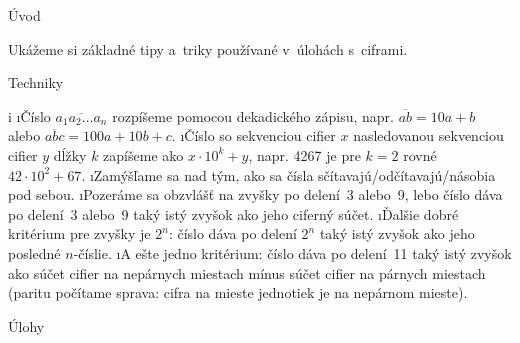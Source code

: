 





\sec Úvod

Ukážeme si základné tipy a~triky používané v~úlohách s~ciframi.

\sec Techniky

\begitems \style i
\i Číslo $\overline{a_1a_2\dots a_n}$ rozpíšeme pomocou dekadického zápisu, napr. $\overline{ab}=10a+b$ alebo $\overline{abc}=100a+10b+c$.
\i Číslo so sekvenciou cifier $x$ nasledovanou sekvenciou cifier $y$ dĺžky $k$ zapíšeme ako $x \cdot 10^k + y$, napr. 4267 je pre $k=2$ rovné $42 \cdot 10^2 + 67$.
\i Zamýšľame sa nad tým, ako sa čísla sčítavajú/odčítavajú/násobia pod sebou.
\i Pozeráme sa obzvlášť na zvyšky po delení~3 alebo~9, lebo číslo dáva po delení~3 alebo~9 taký istý zvyšok ako jeho ciferný súčet.
\i Ďalšie dobré kritérium pre zvyšky je $2^n$: číslo dáva po delení $2^n$ taký istý zvyšok ako jeho posledné $n$-číslie.
\i A ešte jedno kritérium: číslo dáva po delení~11 taký istý zvyšok ako súčet cifier na nepárnych miestach mínus súčet cifier na párnych miestach (paritu počítame sprava: cifra na mieste jednotiek je na nepárnom mieste).
\enditems 

\sec Úlohy


